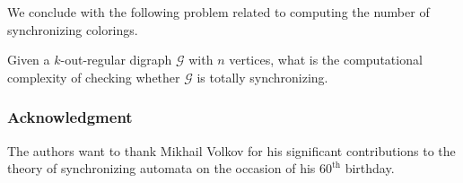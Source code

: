 \documentclass[runningheads]{llncs}
\begin{document}
We conclude with the following problem related to computing the number of synchronizing colorings.

\begin{problem}
Given a $k$-out-regular digraph $\mathcal{G}$ with $n$ vertices, what is the computational complexity of checking whether $\mathcal{G}$ is totally synchronizing.
\end{problem}

\subsubsection{Acknowledgment}
The authors want to thank Mikhail Volkov for his significant contributions to the theory of synchronizing automata on the occasion of his $60^{\text{th}}$ birthday.



\end{document}
